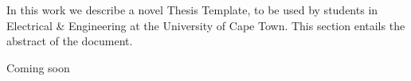 {}

In this work we describe a novel Thesis Template, to be used by students in Electrical \& Engineering at the University of Cape Town. This section entails the abstract of the document. 

%
%
%
Coming soon
